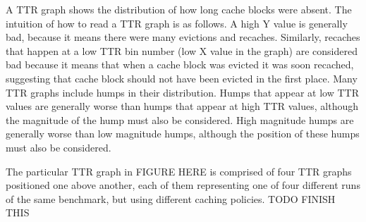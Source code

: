 A TTR graph shows the distribution of how long cache blocks were
absent.  The intuition of how to read a TTR graph is as follows.  A
high Y value is generally bad, because it means there were many
evictions
and recaches.  Similarly, recaches that happen at a low TTR bin number
(low X value in the graph) are considered bad because it means that
when a cache block was evicted it was soon recached, suggesting that
cache block should not have been evicted in the first place.  Many TTR
graphs include humps in their distribution.  Humps that appear at low
TTR values are generally worse than humps that appear at high TTR
values, although the magnitude of the hump must also be considered.
High magnitude humps are generally worse than low magnitude humps,
although the position of these humps must also be considered.

The particular TTR graph in FIGURE HERE is comprised of four TTR
graphs positioned one above another, each of them representing one of
four different runs of the same benchmark, but using different caching
policies.  TODO FINISH THIS
